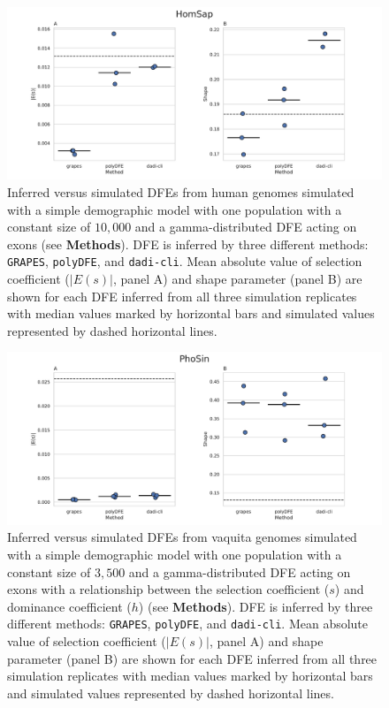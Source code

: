 \documentclass[hidelinks]{article}
\newcommand{\polydfe}{\texttt{polyDFE}\xspace}
\newcommand{\dadicli}{\texttt{dadi-cli}\xspace}
\newcommand{\grapes}{\texttt{GRAPES}\xspace}
\begin{document}
\begin{figure}[h]
    \centering
    \includegraphics[width=\textwidth]{figures/HomSap/Constant/HomSap_Constant_Gamma_K17_ensembl_havana_104_exons_DFE_plot}
    \caption{
       Inferred versus simulated DFEs from human genomes simulated with
       a simple demographic model with one population with a constant size of $10,000$
       and a gamma-distributed DFE acting on exons (see \textbf{Methods}).
        DFE is inferred by three different methods: \grapes, \polydfe , and \dadicli.
        Mean absolute value of selection coefficient ($\lvert E(s) \rvert$, panel A) and shape parameter (panel B)
        are shown for each DFE inferred from all three simulation replicates
        with median values marked by horizontal bars
        and simulated values represented by dashed horizontal lines.
    }
    \label{fig:homsap-dfe.constant}
\end{figure}

\begin{figure}[h]
    \centering
    \includegraphics[width=\textwidth]{figures/PhoSin/Constant/PhoSin_Constant_Gamma_R22_Phocoena_sinus.mPhoSin1.pri.110_exons_DFE_plot.pdf}
    \caption{
    \label{fig:vaquita-dfe.constant}
        Inferred versus simulated DFEs from vaquita genomes simulated with
        a simple demographic model with one population with a constant size of $3,500$
        and a gamma-distributed DFE acting on exons
        with a relationship between the selection coefficient ($s$) and dominance coefficient ($h$) (see \textbf{Methods}).
        DFE is inferred by three different methods: \grapes, \polydfe , and \dadicli.
        Mean absolute value of selection coefficient ($\lvert E(s) \rvert$, panel A) and shape parameter (panel B)
        are shown for each DFE inferred from all three simulation replicates
        with median values marked by horizontal bars
        and simulated values represented by dashed horizontal lines.
    }
\end{figure}
\end{document}
